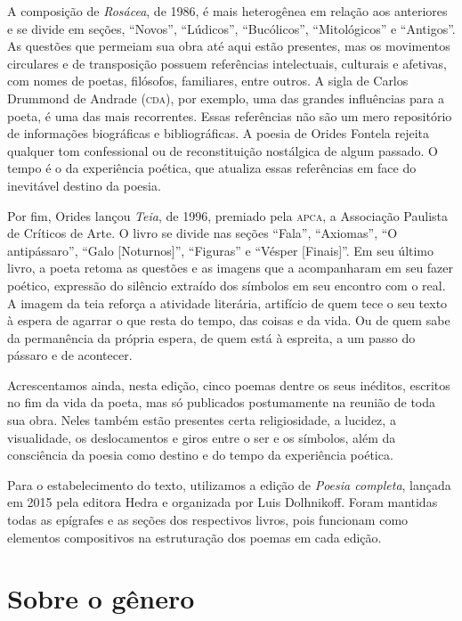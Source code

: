 A composição de \emph{Rosácea}, de 1986, é mais heterogênea em relação
aos anteriores e se divide em seções, ``Novos'', ``Lúdicos'',
``Bucólicos'', ``Mitológicos'' e ``Antigos''. As questões que permeiam
sua obra até aqui estão presentes, mas os movimentos circulares e de
transposição possuem referências intelectuais, culturais e afetivas, com
nomes de poetas, filósofos, familiares, entre outros. A sigla de Carlos
Drummond de Andrade (\textsc{cda}), por exemplo, uma das grandes influências para
a poeta, é uma das mais recorrentes. Essas referências não são um mero
repositório de informações biográficas e bibliográficas. A poesia de
Orides Fontela rejeita qualquer tom confessional ou de reconstituição
nostálgica de algum passado. O tempo é o da experiência poética, que
atualiza essas referências em face do inevitável destino da poesia.

Por fim, Orides lançou \emph{Teia}, de 1996, premiado pela \textsc{apca}, a
Associação Paulista de Críticos de Arte. O livro se divide nas seções
``Fala'', ``Axiomas'', ``O antipássaro'', ``Galo {[}Noturnos{]}'',
``Figuras'' e ``Vésper {[}Finais{]}''. Em seu último livro, a poeta
retoma as questões e as imagens que a acompanharam em seu fazer poético,
expressão do silêncio extraído dos símbolos em seu encontro com o real.
A imagem da teia reforça a atividade literária, artifício de quem tece o
seu texto à espera de agarrar o que resta do tempo, das coisas e da
vida. Ou de quem sabe da permanência da própria espera, de quem está à
espreita, a um passo do pássaro e de acontecer.

Acrescentamos ainda, nesta edição, cinco poemas dentre os seus inéditos,
escritos no fim da vida da poeta, mas só publicados postumamente na
reunião de toda sua obra. Neles também estão presentes certa
religiosidade, a lucidez, a visualidade, os deslocamentos e giros entre
o ser e os símbolos, além da consciência da poesia como destino e do
tempo da experiência poética.

Para o estabelecimento do texto, utilizamos a edição de \emph{Poesia
completa}, lançada em 2015 pela editora Hedra e organizada por Luis
Dolhnikoff. Foram mantidas todas as epígrafes e as seções dos
respectivos livros, pois funcionam como elementos compositivos na
estruturação dos poemas em cada edição.

\pagebreak
\section{Sobre o gênero}

